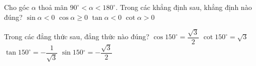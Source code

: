 
\begin{ex}%
	Cho góc $\alpha $ thoả mãn $90^\circ <\alpha <180^\circ $.  Trong các khẳng định sau, khẳng định nào đúng?
	\choice 
		{$\sin \alpha <0$} 
		{$\cos\alpha \ge  0$}
		{\True $\tan \alpha <0$} 
		{$\cot\alpha  >0$}
\end{ex}

\begin{ex}%
	Trong  các đẳng thức sau, đẳng thức nào đúng?
	 \choice
		 {$\cos 150^\circ =\dfrac{\sqrt{3}}{2} $}
		{$\cot 150^\circ =\sqrt{3} $} 
		{\True $\tan 150^\circ  =-\dfrac{1}{\sqrt{3}} $}
		 {$\sin 150{^\circ}=-\dfrac{\sqrt{3}}{2} $}
\end{ex}
